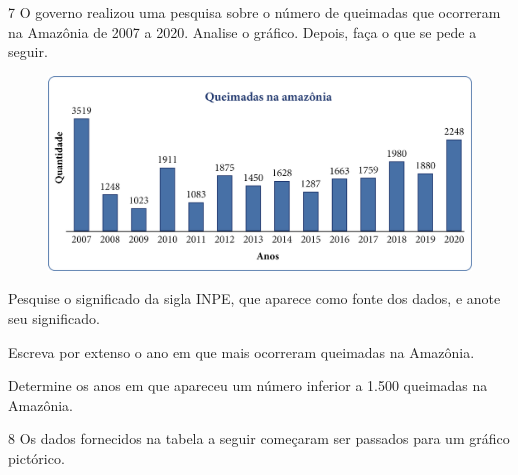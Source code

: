 
\pagebreak
\num{7} O governo realizou uma pesquisa sobre o número de queimadas que
ocorreram na Amazônia de 2007 a 2020. Analise o gráfico. Depois, faça o que se pede a seguir.


\begin{figure}[htpb!]
\centering
\includegraphics[width=\textwidth]{media/image46.png}
\end{figure}

\begin{escolha}
\item
  Pesquise o significado da sigla INPE, que aparece como fonte dos dados,
  e anote seu significado.

\item {}

\item
  Escreva por extenso o ano em que mais ocorreram queimadas na Amazônia.
\item\item {}

\item
  Determine os anos em que apareceu um número inferior a 1.500 queimadas na
  Amazônia.

\item {}
\end{escolha}


\pagebreak
\num{8} Os dados fornecidos na tabela a seguir começaram ser passados para um
gráfico pictórico.


